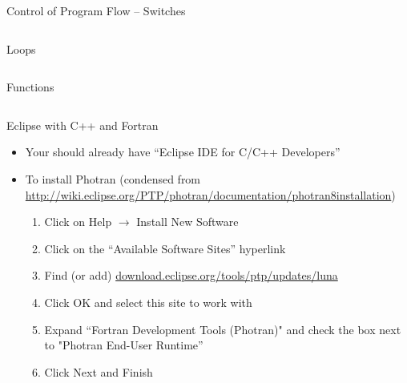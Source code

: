 \documentclass[10pt]{beamer}
\begin{document}
\begin{frame}{Control of Program Flow -- Switches}
\begin{columns}[c]
  \begin{column}{0.5\textwidth}
    
  \end{column}
  \begin{column}{0.5\textwidth}
    
  \end{column}
\end{columns}
\end{frame}

\begin{frame}{Loops}
\begin{columns}[c]
  \begin{column}{0.5\textwidth}
    
  \end{column}
  \begin{column}{0.5\textwidth}
    
  \end{column}
\end{columns}
\end{frame}

\begin{frame}{Functions}
\begin{columns}[c]
  \begin{column}{0.5\textwidth}
    
  \end{column}
  \begin{column}{0.5\textwidth}
    
  \end{column}
\end{columns}
\end{frame}

\begin{frame}{Eclipse with C++ and Fortran}

\begin{itemize}
 \item Your should already have ``Eclipse IDE for C/C++ Developers''
 \item To install Photran (condensed from \url{http://wiki.eclipse.org/PTP/photran/documentation/photran8installation})
    \begin{enumerate}
      \item Click on Help $\rightarrow$ Install New Software
      \item Click on the ``Available Software Sites'' hyperlink 
      \item Find (or add) \url{download.eclipse.org/tools/ptp/updates/luna}
      \item Click OK and select this site to work with
      \item Expand ``Fortran Development Tools (Photran)" and check the box next to "Photran End-User Runtime''
      \item Click Next and Finish
    \end{enumerate}
\end{itemize}

\end{frame}
\end{document}
